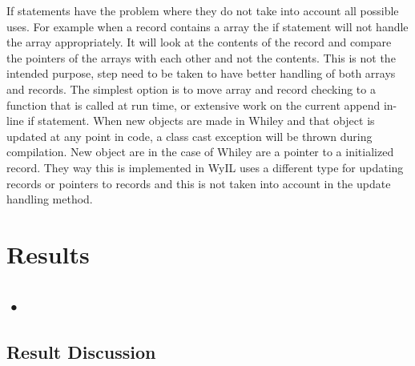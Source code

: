 If statements have the problem where they do not take into account all possible uses. For example when a record contains a array the if statement will not handle the array appropriately. It will look at the contents of the record and compare the pointers of the arrays with each other and not the contents. This is not the intended purpose, step need to be taken to have better handling of both arrays and records. The simplest option is to move array and record checking to a function that is called at run time, or extensive work on the current append in-line if statement. 
When new objects are made in Whiley and that object is updated at any point in code, a class cast exception will be thrown during compilation. New object are in the case of Whiley are a pointer to a initialized record. They way this is implemented in WyIL uses a different type for updating records or pointers to records and this is not taken into account in the update handling method.  

\section{Results}

\subsection{•}

\subsection{Result Discussion}


